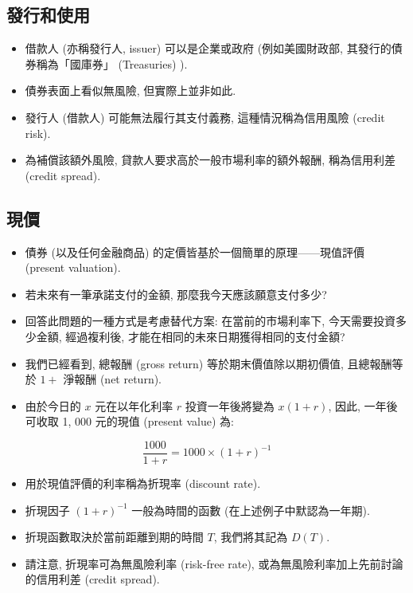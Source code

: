 \documentclass[letterpaper]{article}
\begin{document}
		
		\subsection{發行和使用}
		\begin{itemize}
			\item 借款人 (亦稱發行人, issuer) 可以是企業或政府 (例如美國財政部, 其發行的債券稱為「國庫券」 (Treasuries) ).  
			\item 債券表面上看似無風險, 但實際上並非如此.  
			\item 發行人 (借款人) 可能無法履行其支付義務, 這種情況稱為信用風險 (credit risk).  
			\item 為補償該額外風險, 貸款人要求高於一般市場利率的額外報酬, 稱為信用利差 (credit spread).  
		\end{itemize}
		
		
		\subsection{現價}
		\begin{itemize}
			\item 債券 (以及任何金融商品) 的定價皆基於一個簡單的原理——現值評價 (present valuation).  
			\item 若未來有一筆承諾支付的金額, 那麼我今天應該願意支付多少? 
			\item 回答此問題的一種方式是考慮替代方案: 在當前的市場利率下, 今天需要投資多少金額, 經過複利後, 才能在相同的未來日期獲得相同的支付金額? 
			
			\item 我們已經看到, 總報酬 (gross return) 等於期末價值除以期初價值, 且總報酬等於 \(1+\) 淨報酬 (net return).  
			\item 由於今日的 \(x\) 元在以年化利率 \(r\) 投資一年後將變為 \(x (1+r) \), 因此, 一年後可收取 1, 000 元的現值 (present value) 為: 
		\end{itemize}
		
		
		$$
		\frac{1000}{1+r}=1000 \times (1+r) ^{-1}
		$$
		
		\begin{itemize}
			\item 用於現值評價的利率稱為折現率 (discount rate).  
			\item 折現因子 \( (1 + r) ^{-1}\) 一般為時間的函數 (在上述例子中默認為一年期).  
			\item 折現函數取決於當前距離到期的時間 \(T\), 我們將其記為 \(D (T) \).  
			\item 請注意, 折現率可為無風險利率 (risk-free rate), 或為無風險利率加上先前討論的信用利差 (credit spread).  
		\end{itemize}
		
\end{document}
